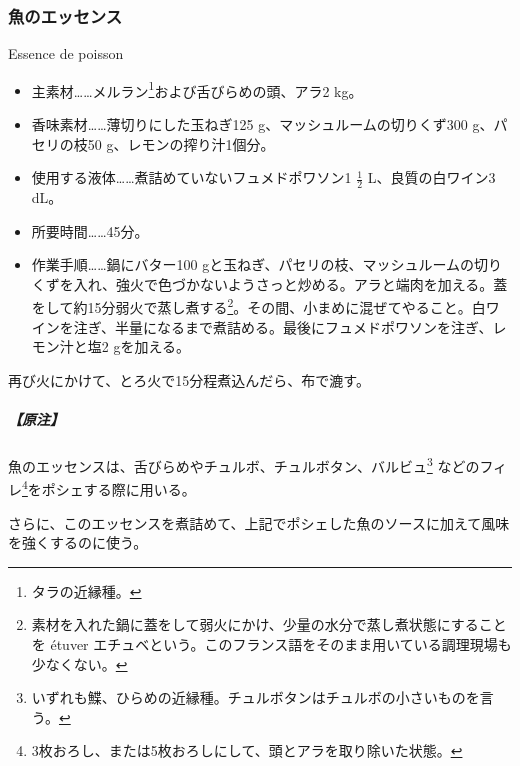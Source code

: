 \begin{recette}
\atoaki{}

\hypertarget{essence-de-poisson}{%
\subsubsection{魚のエッセンス}\label{essence-de-poisson}}

\begin{frsubenv}

Essence de poisson

\end{frsubenv}


\begin{itemize}
\item
  主素材\ldots{}\ldots{}メルラン\footnote{タラの近縁種。}および舌びらめの頭、アラ2
  kg。
\item
  香味素材\ldots{}\ldots{}薄切りにした玉ねぎ125
  g、マッシュルームの切りくず300 g、パセリの枝50
  g、レモンの搾り汁1個分。
\item
  使用する液体\ldots{}\ldots{}煮詰めていないフュメドポワソン1
  \(\frac{1}{2}\) L、良質の白ワイン3 dL。
\item
  所要時間\ldots{}\ldots{}45分。
\item
  作業手順\ldots{}\ldots{}鍋にバター100
  gと玉ねぎ、パセリの枝、マッシュルームの切りくずを入れ、強火で色づかないようさっと炒める。アラと端肉を加える。蓋をして約15分弱火で蒸し煮する\footnote{素材を入れた鍋に蓋をして弱火にかけ、少量の水分で蒸し煮状態にすることを
    étuver
    エチュベという。このフランス語をそのまま用いている調理現場も少なくない。}。その間、小まめに混ぜてやること。白ワインを注ぎ、半量になるまで煮詰める。最後にフュメドポワソンを注ぎ、レモン汁と塩2
  gを加える。
\end{itemize}

再び火にかけて、とろ火で15分程煮込んだら、布で漉す。

\hypertarget{nota-essence-de-poisson}{%
\subparagraph{【原注】}\label{nota-essence-de-poisson}}

魚のエッセンスは、舌びらめやチュルボ、チュルボタン、バルビュ\footnote{いずれも鰈、ひらめの近縁種。チュルボタンはチュルボの小さいものを言う。}
などのフィレ\footnote{3枚おろし、または5枚おろしにして、頭とアラを取り除いた状態。}をポシェする際に用いる。

さらに、このエッセンスを煮詰めて、上記でポシェした魚のソースに加えて風味を強くするのに使う。


\end{recette}
